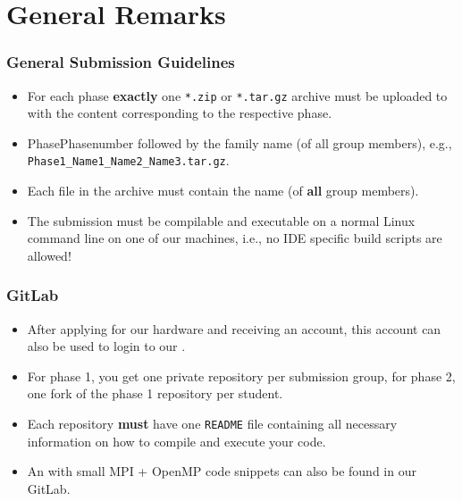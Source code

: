 \section*{General Remarks}
\begin{frame}[fragile]
  \frametitle{General Submission Guidelines}
  \begin{itemize}
    \item For each phase \textbf{exactly} one \texttt{*.zip} or \texttt{*.tar.gz} archive must be uploaded to  with the content corresponding to the respective phase.
    \item PhasePhasenumber followed by the family name (of all group members), e.g., \texttt{Phase1\_Name1\_Name2\_Name3.tar.gz}.
    \item Each file in the archive must contain the name (of \textbf{all} group members).
    \item The submission must be compilable and executable on a normal Linux command line on one of our machines, i.e., no IDE specific build scripts are allowed!
  \end{itemize}
\end{frame}

\begin{frame}
  \frametitle{GitLab}
  \begin{itemize}
    \item After applying for our hardware and receiving an account, this account can also be used to login to our .
    \item For phase 1, you get one private repository per submission group, for phase 2, one fork of the phase 1 repository per student.
    \item Each repository \textbf{must} have one \texttt{README} file containing all necessary information on how to compile and execute your code.
    \item An  with small MPI + OpenMP code snippets can also be found in our GitLab.
  \end{itemize}
\end{frame}

